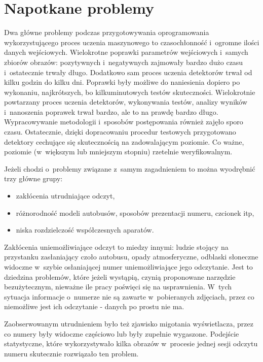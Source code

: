 \section{Napotkane problemy}

Dwa główne problemy podczas przygotowywania
oprogramowania wykorzystującego proces uczenia 
maszynowego to czasochłonność i~ogromne ilości danych wejściowych.
Wielokrotne poprawki parametrów wejściowych i~samych zbiorów obrazów:
pozytywnych i~negatywnych zajmowały bardzo dużo czasu i~ostatecznie
trwały długo. Dodatkowo sam proces uczenia detektorów trwał od kilku godzin do 
kilku dni. Poprawki były możliwe do naniesienia dopiero po wykonaniu, najkrótszych, bo 
kilkuminutowych testów skuteczności. Wielokrotnie powtarzany proces
uczenia detektorów, wykonywania testów, analizy wyników i~nanoszenia poprawek 
trwał bardzo, ale to na prawdę bardzo długo. 
Wypracowywanie metodologii i~sposobów postępowania 
również zajęło sporo czasu. Ostatecznie, dzięki dopracowaniu procedur
testowych przygotowano detektory cechujące się skutecznością na zadowalającym poziomie.
Co ważne, poziomie (w~większym lub mniejszym stopniu) rzetelnie weryfikowalnym.

Jeżeli chodzi o~problemy związane z~samym zagadnieniem
to można wyodrębnić trzy główne grupy:

\begin{itemize}
	\item zakłócenia utrudniające odczyt,
	\item różnorodność modeli autobusów, sposobów prezentacji numeru, czcionek itp,
	\item niska rozdzielczość współczesnych aparatów.
\end{itemize}

Zakłócenia uniemożliwiające odczyt to miedzy innymi: ludzie stojący
na przystanku zasłaniający czoło autobusu, opady atmosferyczne,
odblaski słoneczne widoczne w~szybie osłaniającej numer uniemożliwiające jego
odczytanie. Jest to dziedzina problemów, które jeżeli wystąpią,
czynią proponowane narzędzie bezużytecznym, nieważne ile pracy
poświęci się na usprawnienia. W~tych sytuacja informacje 
o~numerze nie są zawarte w~pobieranych zdjęciach, przez co niemożliwe
jest ich odczytanie - danych po prostu nie ma.

Zaobserwowanym utrudnieniem było też zjawisko migotania wyświetlacza, przez
co numery były widoczne częściowo lub były zupełnie wygaszone.
Podejście statystyczne, które wykorzystywało kilka obrazów
w~procesie jednej sesji odczytu numeru skutecznie rozwiązało ten problem.

